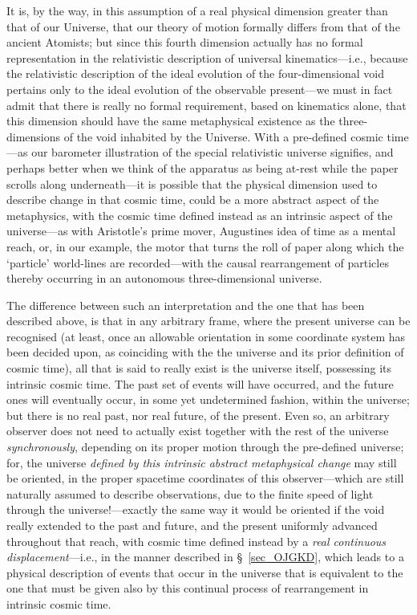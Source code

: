 It is, by the way, in this assumption of a real physical dimension greater than that of our Universe, that our theory of motion formally differs from that of the ancient Atomists; but since this fourth dimension actually has no formal representation in the relativistic description of universal kinematics---i.e., because the relativistic description of the ideal evolution of the four-dimensional void pertains only to the ideal evolution of the observable present---we must in fact admit that there is really no formal requirement, based on kinematics alone, that this dimension should have the same metaphysical existence as the three-dimensions of the void inhabited by the Universe. With a pre-defined cosmic time---as our barometer illustration of the special relativistic universe signifies, and perhaps better when we think of the apparatus as being at-rest while the paper scrolls along underneath---it is possible that the physical dimension used to describe change in that cosmic time, could be a more abstract aspect of the metaphysics, with the cosmic time defined instead as an intrinsic aspect of the universe---as with Aristotle's prime mover, Augustines idea of time as a mental reach, or, in our example, the motor that turns the roll of paper along which the `particle' world-lines are recorded---with the causal rearrangement of particles thereby occurring in an autonomous three-dimensional universe. 

The difference between such an interpretation and the one that has been described above, is that in any arbitrary frame, where the present universe can be recognised (at least, once an allowable orientation in some coordinate system has been decided upon, as coinciding with the the universe and its prior definition of cosmic time), all that is said to really exist is the universe itself, possessing its intrinsic cosmic time. The past set of events will have occurred, and the future ones will eventually occur, in some yet undetermined fashion, within the universe; but there is no real past, nor real future, of the present. Even so, an arbitrary observer does not need to actually exist together with the rest of the universe \textit{synchronously},  depending on its proper motion through the pre-defined universe; for, the universe \textit{defined by this intrinsic abstract metaphysical change} may still be oriented, in the proper spacetime coordinates of this observer---which are still naturally assumed to describe observations, due to the finite speed of light through the universe!---exactly the same way it would be oriented if the void really extended to the past and future, and the present uniformly advanced throughout that reach, with cosmic time defined instead by a \textit{real continuous displacement}---i.e., in the manner described in \S~\ref{sec_OJGKD}, which leads to a physical description of events that occur in the universe that is equivalent to the one that must be given also by this continual process of rearrangement in intrinsic cosmic time.


